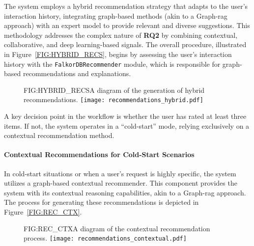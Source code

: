 The system employs a hybrid recommendation strategy that adapts to the user's interaction history, integrating graph-based methods (akin to a Graph-\ac{rag} approach) with an expert model to provide relevant and diverse suggestions. This methodology addresses the complex nature of \textbf{RQ2} by combining contextual, collaborative, and deep learning-based signals. The overall procedure, illustrated in Figure~\ref{FIG:HYBRID_RECS}, begins by assessing the user's interaction history with the \texttt{FalkorDBRecommender} module, which is responsible for graph-based recommendations and explanations.

\begin{figure}[Hybrid Recommendations Diagram]{FIG:HYBRID_RECS}{A diagram of the generation of hybrid recommendations.}
    \texttt{[image: recommendations\_hybrid.pdf]}
\end{figure}

A key decision point in the workflow is whether the user has rated at least three items. If not, the system operates in a ``cold-start'' mode, relying exclusively on a contextual recommendation method.

\paragraph{Contextual Recommendations for Cold-Start Scenarios}
In cold-start situations or when a user's request is highly specific, the system utilizes a graph-based contextual recommender. This component provides the system with its contextual reasoning capabilities, akin to a Graph-\ac{rag} approach. The process for generating these recommendations is depicted in Figure~\ref{FIG:REC_CTX}.

\begin{figure}[Contextual Recommendations Diagram]{FIG:REC_CTX}{A diagram of the contextual recommendation process.}
    \texttt{[image: recommendations\_contextual.pdf]}
\end{figure}

